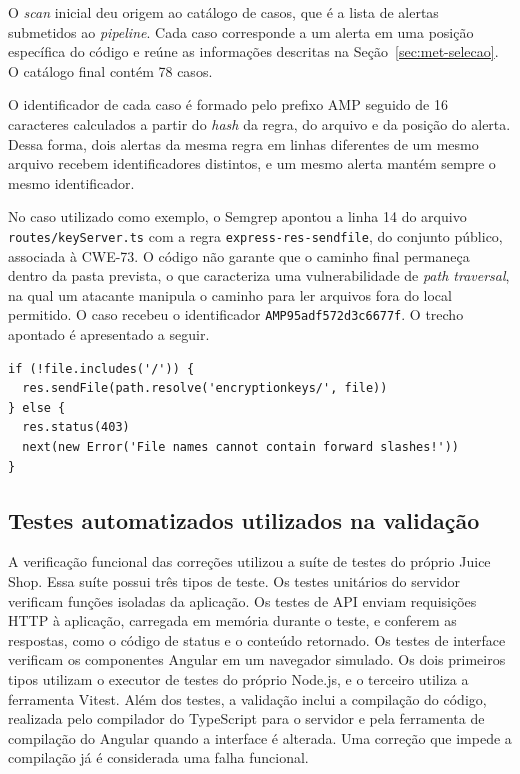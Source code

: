 O \textit{scan} inicial deu origem ao catálogo de casos, que é a lista de alertas submetidos ao \textit{pipeline}. Cada caso corresponde a um alerta em uma posição específica do código e reúne as informações descritas na Seção~\ref{sec:met-selecao}. O catálogo final contém 78 casos.

O identificador de cada caso é formado pelo prefixo AMP seguido de 16 caracteres calculados a partir do \textit{hash} da regra, do arquivo e da posição do alerta. Dessa forma, dois alertas da mesma regra em linhas diferentes de um mesmo arquivo recebem identificadores distintos, e um mesmo alerta mantém sempre o mesmo identificador.

No caso utilizado como exemplo, o Semgrep apontou a linha 14 do arquivo \texttt{routes/keyServer.ts} com a regra \texttt{express-res-sendfile}, do conjunto público, associada à CWE-73. O código não garante que o caminho final permaneça dentro da pasta prevista, o que caracteriza uma vulnerabilidade de \textit{path traversal}, na qual um atacante manipula o caminho para ler arquivos fora do local permitido. O caso recebeu o identificador \texttt{AMP95adf572d3c6677f}. O trecho apontado é apresentado a seguir.

{\footnotesize
\begin{verbatim}
if (!file.includes('/')) {
  res.sendFile(path.resolve('encryptionkeys/', file))
} else {
  res.status(403)
  next(new Error('File names cannot contain forward slashes!'))
}
\end{verbatim}
}

\subsection{Testes automatizados utilizados na validação}
\label{sec:impl-testes}

A verificação funcional das correções utilizou a suíte de testes do próprio Juice Shop. Essa suíte possui três tipos de teste. Os testes unitários do servidor verificam funções isoladas da aplicação. Os testes de API enviam requisições HTTP à aplicação, carregada em memória durante o teste, e conferem as respostas, como o código de status e o conteúdo retornado. Os testes de interface verificam os componentes Angular em um navegador simulado. Os dois primeiros tipos utilizam o executor de testes do próprio Node.js, e o terceiro utiliza a ferramenta Vitest. Além dos testes, a validação inclui a compilação do código, realizada pelo compilador do TypeScript para o servidor e pela ferramenta de compilação do Angular quando a interface é alterada. Uma correção que impede a compilação já é considerada uma falha funcional.

